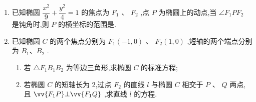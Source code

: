 \begin{enumerate}
\begin{jieda}
        同理,用 $- \dfrac{1}{k}$ 代上式中的 $k$ ,得 $\left| {AB}\right|  = \dfrac{2{a}^{2}\sqrt{1 + {k}^{2}}}{{a}^{2} + {k}^{2}}$ .
        
        由 $\left| {BC}\right|  = \left| {AB}\right|$ ,得 $\left| k\right| \left( {{a}^{2} + {k}^{2}}\right)  = 1 + {a}^{2}{k}^{2}$ . 又 $k < 0$ ,得 $\left( {k + 1}\right) \left\lbrack  {{k}^{2} + \left( {{a}^{2} - 1}\right) k}+1\right\rbrack  = 0$ . 
        
        当 ${\left( {a}^{2} - 1\right) }^{2} - 4 < 0$ ,即 $1 < a < \sqrt{3}$ 时,方程$\left( {k + 1}\right) \left\lbrack  {{k}^{2} + \left( {{a}^{2} - 1}\right) k}+1\right\rbrack  = 0$有唯一解 $k =  - 1$ ; 
        
        当 $a = \sqrt{3}$ 时,方程 ${k}^{2} + \left( {{a}^{2} - 1}\right) k + 1 = 0$ 的解为 $k =  - 1$ ,此时方程$\left( {k + 1}\right) \left\lbrack  {{k}^{2} + \left( {{a}^{2} - 1}\right) k}+1\right\rbrack  = 0$有唯一解 $k =  - 1$ ; 
        
        当 $a > \sqrt{3}$ 时,方程$\left( {k + 1}\right) \left\lbrack  {{k}^{2} + \left( {{a}^{2} - 1}\right) k}+1\right\rbrack  = 0$有三个不同解. 
        
        综上所述,当 $1 < a \leq  \sqrt{3}$ 时,最多作出一个满足条件的三角形; 当 $a > \sqrt{3}$ 时,最多可作出三个满足条件的三角形.
    \end{jieda}
    \item 已知椭圆 $\dfrac{{x}^{2}}{9} + \dfrac{{y}^{2}}{4} = 1$ 的焦点为 ${F}_{1}$ 、 ${F}_{2}$ ,点 $P$ 为椭圆上的动点,当 $\angle {F}_{1}P{F}_{2}$ 是钝角时,则 $P$ 的横坐标的范围是.
    \item 已知椭圆 $C$ 的两个焦点分别为 ${F}_{1}\left( {-1,0}\right)$ 、 ${F}_{2}\left( {1,0}\right)$ ,短轴的两个端点分别为 ${B}_{1}\text{、}{B}_{2}$ . 
    \begin{enumerate}
        \item 若 $\bigtriangleup {F}_{1}{B}_{1}{B}_{2}$ 为等边三角形,求椭圆 $C$ 的标准方程;
        \item 若椭圆 $C$ 的短轴长为 2,过点 ${F}_{2}$ 的直线 $l$ 与椭圆 $C$ 相交于 $P$ 、 $Q$ 两点,且 $\vv{{F}_{1}P}\bot \vv{{F}_{1}Q}$ ,求直线 $l$ 的方程.
    \end{enumerate}


\end{enumerate}

